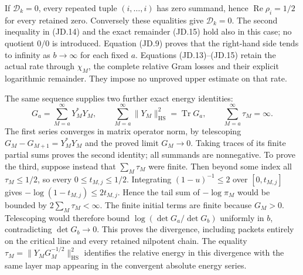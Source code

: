 If \(\mathcal D_k=0\), every repeated tuple
\((i,\ldots,i)\) has zero summand, hence
\(\operatorname{Re}\rho_i=1/2\) for every retained zero.
Conversely these equalities give \(\mathcal D_k=0\).
The second inequality in (JD.14) and the exact remainder (JD.15)
hold also in this case; no quotient \(0/0\) is introduced.
Equation (JD.9) proves that the right-hand side tends to infinity
as \(b\to\infty\) for each fixed \(a\).  Equations
(JD.13)--(JD.15) retain the actual rate through \(\chi_M\),
the complete relative Gram losses and their explicit logarithmic
remainder.  They impose no unproved upper estimate on that rate.

The same sequence supplies two further exact energy identities:
\[
 G_a=\sum_{M=a}^\infty Y_M^*Y_M,\qquad
 \sum_{M=a}^\infty\|Y_M\|_{\mathrm{HS}}^2=\operatorname{Tr}G_a,
 \qquad
 \sum_{M=a}^\infty\tau_M=\infty.
 \tag{JD.16}
\]
The first series converges in matrix operator norm, by telescoping
\(G_M-G_{M+1}=Y_M^*Y_M\) and the proved limit \(G_M\to0\).
Taking traces of its finite partial sums proves the second identity;
all summands are nonnegative.  To prove the third, suppose instead
that \(\sum_M\tau_M\) were finite.  Then beyond some index all
\(\tau_M\le1/2\), so every \(0\le t_{M,j}\le1/2\).
Integrating \((1-u)^{-1}\le2\) over \([0,t_{M,j}]\) gives
\(-\log(1-t_{M,j})\le2t_{M,j}\).  Hence the tail sum of
\(-\log\pi_M\) would be bounded by \(2\sum_M\tau_M<\infty\).
The finite initial terms are finite because \(G_M>0\).
Telescoping would therefore bound
\(\log(\det G_a/\det G_b)\) uniformly in \(b\), contradicting
\(\det G_b\to0\).  This proves the divergence, including
packets entirely on the critical line and every retained
nilpotent chain.  The equality
\(\tau_M=\|Y_MG_M^{-1/2}\|_{\mathrm{HS}}^2\) identifies
the relative energy in this divergence with the same layer map
appearing in the convergent absolute energy series.
